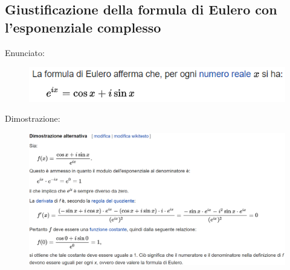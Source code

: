 \documentclass[a4paper, 9pt]{report}
\begin{document}
\subsection*{Giustificazione della formula di Eulero con l’esponenziale complesso}
Enunciato:
\begin{figure}[h!]
    \includegraphics[width=\linewidth]{../dim/eulero1.PNG}
\end{figure}
\newline
Dimostrazione:\begin{figure}[h!]
    \includegraphics[width=\linewidth]{../dim/eulero2.PNG}
\end{figure}
\newline
\end{document}
